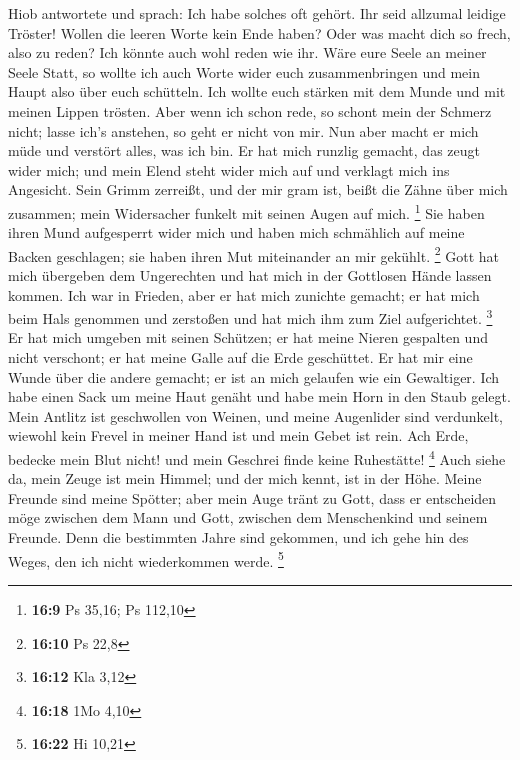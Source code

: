  Hiob antwortete und sprach:  Ich habe
solches oft gehört. Ihr seid allzumal leidige Tröster! 
Wollen die leeren Worte kein Ende haben? Oder was macht dich so frech,
also zu reden?  Ich könnte auch wohl reden wie ihr. Wäre
eure Seele an meiner Seele Statt, so wollte ich auch Worte wider euch
zusammenbringen und mein Haupt also über euch schütteln. 
Ich wollte euch stärken mit dem Munde und mit meinen Lippen trösten.
 Aber wenn ich schon rede, so schont mein der Schmerz
nicht; lasse ich's anstehen, so geht er nicht von mir. 
Nun aber macht er mich müde und verstört alles, was ich bin.
 Er hat mich runzlig gemacht, das zeugt wider mich; und
mein Elend steht wider mich auf und verklagt mich ins Angesicht.
 Sein Grimm zerreißt, und der mir gram ist, beißt die
Zähne über mich zusammen; mein Widersacher funkelt mit seinen Augen auf
mich. \footnote{\textbf{16:9} Ps 35,16; Ps 112,10}  Sie
haben ihren Mund aufgesperrt wider mich und haben mich schmählich auf
meine Backen geschlagen; sie haben ihren Mut miteinander an mir gekühlt.
\footnote{\textbf{16:10} Ps 22,8}  Gott hat mich
übergeben dem Ungerechten und hat mich in der Gottlosen Hände lassen
kommen.  Ich war in Frieden, aber er hat mich zunichte
gemacht; er hat mich beim Hals genommen und zerstoßen und hat mich ihm
zum Ziel aufgerichtet. \footnote{\textbf{16:12} Kla 3,12}
 Er hat mich umgeben mit seinen Schützen; er hat meine
Nieren gespalten und nicht verschont; er hat meine Galle auf die Erde
geschüttet.  Er hat mir eine Wunde über die andere
gemacht; er ist an mich gelaufen wie ein Gewaltiger.  Ich
habe einen Sack um meine Haut genäht und habe mein Horn in den Staub
gelegt.  Mein Antlitz ist geschwollen von Weinen, und
meine Augenlider sind verdunkelt,  wiewohl kein Frevel in
meiner Hand ist und mein Gebet ist rein.  Ach Erde,
bedecke mein Blut nicht! und mein Geschrei finde keine Ruhestätte!
\footnote{\textbf{16:18} 1Mo 4,10}  Auch siehe da, mein
Zeuge ist mein Himmel; und der mich kennt, ist in der Höhe.
 Meine Freunde sind meine Spötter; aber mein Auge tränt
zu Gott,  dass er entscheiden möge zwischen dem Mann und
Gott, zwischen dem Menschenkind und seinem Freunde.  Denn
die bestimmten Jahre sind gekommen, und ich gehe hin des Weges, den ich
nicht wiederkommen werde. \footnote{\textbf{16:22} Hi 10,21}

